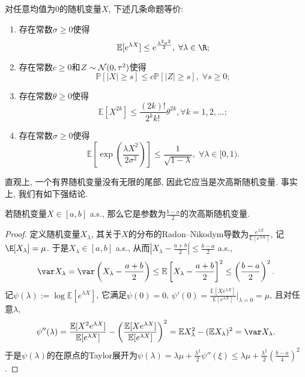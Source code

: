 \begin{theorem}[次高斯随机变量的等价定义]
	对任意均值为$0$的随机变量$X$, 下述几条命题等价: 
	\begin{enumerate}[label=(\Roman*)]
		\item 存在常数$\sigma \geq 0$使得
			\begin{equation*}
				\mathbb{E}[e^{\lambda X} ] \leq e^{\frac{\lambda^2 \sigma^2}{2}},\; \forall \lambda \in \R; 
			\end{equation*}
		\item 存在常数$c \geq 0$和$Z \sim \mathcal{N}(0, \tau^2)$使得
			\begin{equation*}
				\mathbb{P}[|X| \geq s] \leq c \mathbb{P}[|Z| \geq s],\; \forall s \geq 0; 
			\end{equation*}
		\item 存在常数$\theta \geq 0$使得
			\begin{equation*}
				\mathbb{E}[X^{2k}] \leq \frac{(2k)!}{2^k k!} \theta^{2k}, \forall k = 1,2,\dots;
			\end{equation*}
		\item 存在常数$\sigma \geq 0$使得
			\begin{equation*}
				\mathbb{E}\left[ \exp\left(\frac{\lambda X^2}{2 \sigma^2}\right) \right] \leq \frac{1}{\sqrt{1 - \lambda}},\; \forall \lambda \in [0,1).
			\end{equation*}
	\end{enumerate}
\end{theorem}

直观上, 一个有界随机变量没有无限的尾部, 因此它应当是次高斯随机变量. 
事实上, 我们有如下强结论. 
\begin{lemma}[有界随机变量的次高斯参数]\label{lemma:SubGaussianParameterOfBddRV}
	若随机变量$X \in [a, b]$ a.s., 那么它是参数为$\frac{b-a}{2}$的次高斯随机变量. 
\end{lemma}
\begin{proof}
	定义随机变量$X_{\lambda}$, 其关于$X$的分布的Radon–Nikodym导数为$\frac{e^{\lambda X}}{\mathbb{E}[e^{\lambda X}]}$, 记$\E[X_{\lambda}] = \mu$. 
	于是$X_{\lambda} \in [a, b]$ a.s., 从而$\left|X_{\lambda} - \frac{a+b}{2} \right| \leq \frac{b-a}{2}$ a.s., 
	\begin{equation*}
		\var X_{\lambda}
		= \var \left(X_{\lambda} - \frac{a+b}{2} \right) 
		\leq \mathbb{E}\left[X_{\lambda} - \frac{a+b}{2} \right]^2 
		\leq \left(\frac{b-a}{2}\right)^2. 
	\end{equation*}
	记$\psi(\lambda) := \log \mathbb{E}[e^{\lambda X}]$, 它满足$\psi(0) = 0$, $\psi'(0) = \frac{\mathbb{E}[X e^{\lambda X}]}{\mathbb{E}[e^{\lambda X}]} \big|_{\lambda = 0} = \mu$, 且对任意$\lambda$,  
	\begin{equation*}
		\psi''(\lambda) 
		= \frac{\mathbb{E}[X^2 e^{\lambda X}]}{\mathbb{E}[e^{\lambda X}]} - \left( \frac{\mathbb{E}[X e^{\lambda X}]}{\mathbb{E}[e^{\lambda X}]} \right)^2
		= \mathbb{E}X_{\lambda}^2 - (\mathbb{E}X_{\lambda})^2
		= \var X_{\lambda}.  
	\end{equation*}
	于是$\psi(\lambda)$的在原点的Taylor展开为$\psi(\lambda) = \lambda \mu + \frac{\lambda^2}{2} \psi''(\xi) \leq \lambda \mu + \frac{\lambda^2}{2} \left(\frac{b-a}{4}\right)^2$. 
\end{proof}


